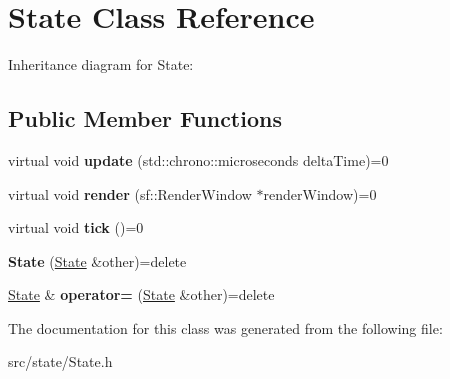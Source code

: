 \hypertarget{classState}{\section{State Class Reference}
\label{classState}
}


Inheritance diagram for State\-:
\subsection*{Public Member Functions}
\begin{DoxyCompactItemize}
\item 
\hypertarget{classState_af2121f8eb52144b7a789214f15e3601a}{virtual void {\bfseries update} (std\-::chrono\-::microseconds delta\-Time)=0}\label{classState_af2121f8eb52144b7a789214f15e3601a}

\item 
\hypertarget{classState_abea822ddf8d4a55439a0040eba979afb}{virtual void {\bfseries render} (sf\-::\-Render\-Window $\ast$render\-Window)=0}\label{classState_abea822ddf8d4a55439a0040eba979afb}

\item 
\hypertarget{classState_a1cdec36e9ffad91ba7af560770601017}{virtual void {\bfseries tick} ()=0}\label{classState_a1cdec36e9ffad91ba7af560770601017}

\item 
\hypertarget{classState_a8fba10b9995ce898339f3b0d39234788}{{\bfseries State} (\hyperlink{classState}{State} \&other)=delete}\label{classState_a8fba10b9995ce898339f3b0d39234788}

\item 
\hypertarget{classState_a7ac6cc4de6723746df3dfb183b8eb84f}{\hyperlink{classState}{State} \& {\bfseries operator=} (\hyperlink{classState}{State} \&other)=delete}\label{classState_a7ac6cc4de6723746df3dfb183b8eb84f}

\end{DoxyCompactItemize}


The documentation for this class was generated from the following file\-:\begin{DoxyCompactItemize}
\item 
src/state/State.\-h\end{DoxyCompactItemize}

